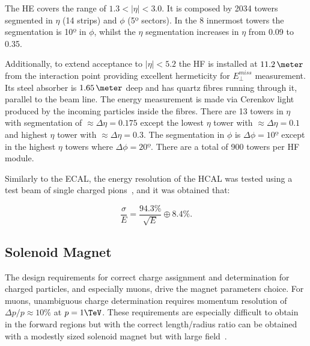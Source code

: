 The \acrfull{HE} covers the range of $1.3<|\eta|<3.0$. It is composed by 2034 towers segmented in $\eta$ (14 strips) and $\phi$ (5º sectors). In the 8 innermost towers the segmentation is 10º in $\phi$, whilst the $\eta$ segmentation increases in $\eta$ from 0.09 to 0.35.

Additionally, to extend acceptance to $|\eta|<5.2$ the \gls{HF} is installed at $11.2\,\meter$ from the interaction point providing excellent hermeticity for $E_{\perp}^{miss}$ measurement. Its steel absorber is $1.65\,\meter$ deep and has quartz fibres running through it, parallel to the beam line. The energy measurement is made via Cerenkov light produced by the incoming particles inside the fibres. There are 13 towers in $\eta$ with segmentation of $\approx \Delta\eta=0.175$ except the lowest $\eta$ tower with $\approx \Delta\eta=0.1$ and highest $\eta$ tower with $\approx \Delta\eta=0.3$. The segmentation in $\phi$ is $\Delta\phi=10º$ except in the highest $\eta$ towers where $\Delta\phi=20º$. There are a total of 900 towers per \gls{HF} module. 

Similarly to the \gls{ECAL}, the energy resolution of the \gls{HCAL} was tested using a test beam of single charged pions~\cite{ARTICLE:CMSECALTestBeam}, and it was obtained that:

\begin{equation}
\frac{\sigma}{E} = \frac{94.3\%}{\sqrt{E}} \oplus 8.4\%.
\end{equation}

\subsection{Solenoid Magnet}
\label{SUBSECTION:ExperimentalApparatus_CMS_Magnet}


The design requirements for correct charge assignment and \pt determination for charged particles, and especially muons, drive the magnet parameters choice. For muons, unambiguous charge determination requires momentum resolution of $\Delta p/p \approx 10\%$ at $p = 1 \TeV$. These requirements are especially difficult to obtain in the forward regions but with the correct length/radius ratio can be obtained with a modestly sized solenoid magnet but with large field~\cite{CMSTDR:CMSPhysicsVol1,CMSTDR:CMSMagnet}.

